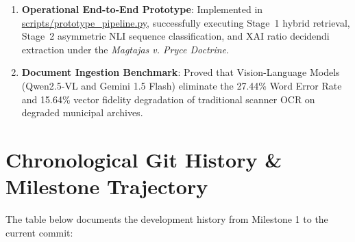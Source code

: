 \documentclass[10pt,letterpaper]{article}
\begin{document}
\begin{enumerate}
    \item \textbf{Operational End-to-End Prototype}: Implemented in \url{scripts/prototype_pipeline.py}, successfully executing Stage~1 hybrid retrieval, Stage~2 asymmetric NLI sequence classification, and XAI ratio decidendi extraction under the \textit{Magtajas v. Pryce Doctrine}.
    \item \textbf{Document Ingestion Benchmark}: Proved that Vision-Language Models (Qwen2.5-VL and Gemini 1.5 Flash) eliminate the 27.44\% Word Error Rate and 15.64\% vector fidelity degradation of traditional scanner OCR on degraded municipal archives.
\end{enumerate}

\section{Chronological Git History \& Milestone Trajectory}
The table below documents the development history from Milestone 1 to the current commit:
\end{document}
